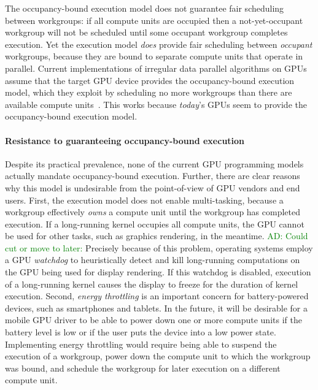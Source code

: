 \documentclass[nocopyrightspace]{sigplanconf-pldi16}
\newcommand{\ADComment}[1]{\textcolor{green}{AD: #1}}
\begin{document}
The occupancy-bound execution model does not guarantee fair scheduling
between workgroups: if all compute units are occupied then a
not-yet-occupant workgroup will not be scheduled until some occupant
workgroup completes execution.  Yet the execution model \emph{does}
provide fair scheduling between \emph{occupant} workgroups, because
they are bound to separate compute units that operate in parallel.
Current implementations of irregular data parallel algorithms on GPUs
assume that the target GPU device provides the occupancy-bound
execution model, which they exploit by scheduling no more workgroups
than there are available compute units~\cite{...}.  This works
because \emph{today}'s GPUs seem to provide the occupancy-bound
execution model.

\paragraph{Resistance to guaranteeing occupancy-bound execution}

Despite its practical prevalence, none of the current GPU programming
models actually mandate occupancy-bound execution.  Further, there are
clear reasons why this model is undesirable from the point-of-view of
GPU vendors and end users.  First, the execution model does not enable
multi-tasking, because a workgroup effectively \emph{owns} a compute
unit until the workgroup has completed execution.  If a long-running
kernel occupies all compute units, the GPU cannot be used for other
tasks, such as graphics rendering, in the meantime.  \ADComment{Could cut or move to later:} Precisely because
of this problem, operating systems employ a GPU \emph{watchdog} to
heuristically detect and kill long-running computations on the GPU
being used for display rendering.  If this watchdog is disabled,
execution of a long-running kernel causes the display to freeze for
the duration of kernel execution.  Second, \emph{energy throttling} is
an important concern for battery-powered devices, such as smartphones
and tablets.  In the future, it will be desirable for a mobile GPU driver to be able to
power down one or more compute units if the battery level is low or if
the user puts the device into a low power state.  Implementing energy
throttling would require being able to suspend the execution of a
workgroup, power down the compute unit to which the workgroup was
bound, and schedule the workgroup for later execution on a different
compute unit.
\end{document}

